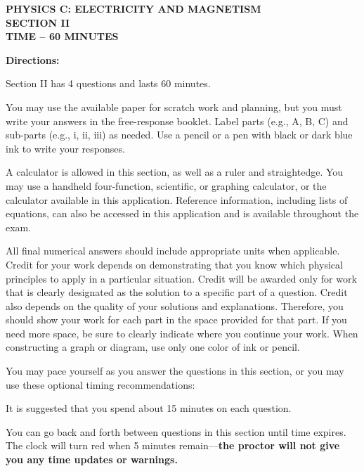 \documentclass[12pt]{../../oss-apphys-exam}
\begin{document}
\begin{center}
  {\Large\textbf{PHYSICS C: ELECTRICITY AND MAGNETISM\\
      SECTION II\\
      TIME -- 60 MINUTES
    }
  }
\end{center}


\vspace{2in}
\textbf{Directions:}

Section II has 4 questions and lasts 60 minutes.

You may use the available paper for scratch work and planning, but you must
write your answers in the free-response booklet. Label parts (e.g., A, B, C)
and sub-parts (e.g., i, ii, iii) as needed. Use a pencil or a pen with black or
dark blue ink to write your responses.

A calculator is allowed in this section, as well as a ruler and straightedge.
You may use a handheld four-function, scientific, or graphing calculator, or
the calculator available in this application. Reference information, including
lists of equations, can also be accessed in this application and is available
throughout the exam.

All final numerical answers should include appropriate units when applicable.
Credit for your work depends on demonstrating that you know which physical
principles to apply in a particular situation. Credit will be awarded only for
work that is clearly designated as the solution to a specific part of a
question. Credit also depends on the quality of your solutions and explanations.
Therefore, you should show your work for each part in the space provided for
that part. If you need more space, be sure to clearly indicate where you
continue your work. When constructing a graph or diagram, use only one color of
ink or pencil.

You may pace yourself as you answer the questions in this section, or you may
use these optional timing recommendations:

It is suggested that you spend about 15 minutes on each question.

You can go back and forth between questions in this section until time expires.
The clock will turn red when 5 minutes remain---\textbf{the proctor will not
  give you any time updates or warnings.}
\newpage
\end{document}
